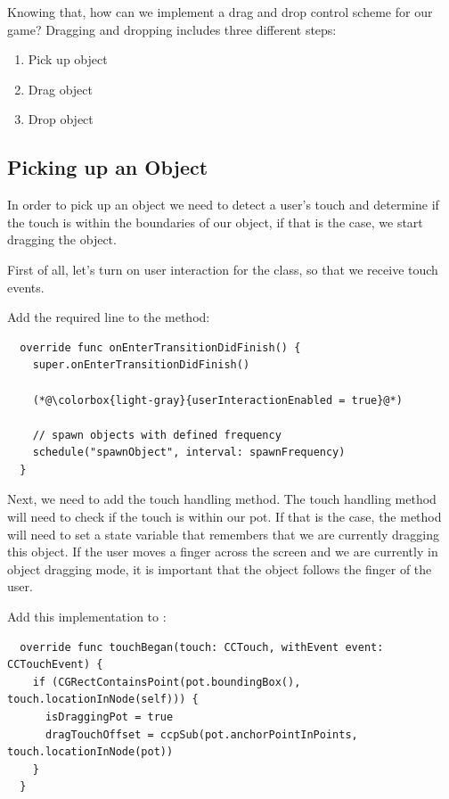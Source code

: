 Knowing that, how can we implement a drag and drop control scheme for our game?
Dragging and dropping includes three different steps:
\begin{enumerate}
  \item Pick up object
  \item Drag object
  \item Drop object
\end{enumerate}

\subsection{Picking up an Object}
In order to pick up an object we need to detect a user's touch and determine if
the touch is within the boundaries of our object, if that is the case,
we start dragging the object.

First of all, let's turn on user interaction for the 
class, so that we receive touch events.

\begin{leftbar}
Add the required line to the  method:
\begin{lstlisting}
  override func onEnterTransitionDidFinish() {
    super.onEnterTransitionDidFinish()
    
    (*@\colorbox{light-gray}{userInteractionEnabled = true}@*) 
    
    // spawn objects with defined frequency
    schedule("spawnObject", interval: spawnFrequency)
  }
\end{lstlisting}
\end{leftbar}

Next, we need to add the touch handling method. The touch handling method will
need to check if the touch is within our pot. If that is the case, the method
will need to set a state variable that remembers that we are currently dragging
this object. If the user moves a finger across the screen and we are currently
in object dragging mode, it is important that the object follows the finger of
the user.

\begin{leftbar}
Add this implementation to :
\begin{lstlisting}
  override func touchBegan(touch: CCTouch, withEvent event: CCTouchEvent) {
    if (CGRectContainsPoint(pot.boundingBox(), touch.locationInNode(self))) {
      isDraggingPot = true
      dragTouchOffset = ccpSub(pot.anchorPointInPoints, touch.locationInNode(pot))
    }
  }
\end{lstlisting}
\end{leftbar}

